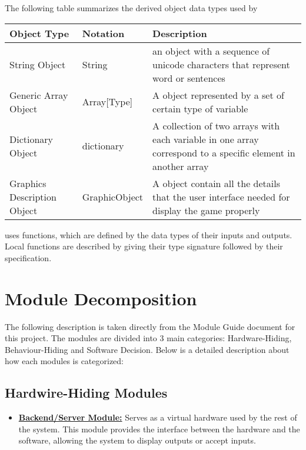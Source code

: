 \documentclass[12pt, titlepage]{article}
\begin{document}
The following table summarizes the derived object data types used by 

\begin{center}
\renewcommand{\arraystretch}{1.2}
\noindent 
\begin{tabular}{l l p{7.5cm}} 
\toprule 
\textbf{Object Type} & \textbf{Notation} & \textbf{Description}\\ 
\midrule
String Object & String & an object with a sequence of unicode characters that represent word or sentences\\
Generic Array Object & Array[Type] & A object represented by a set of certain type of variable \\
Dictionary Object & dictionary & A collection of two arrays with each variable in one array correspond to a specific element in another array\\
Graphics Description Object & GraphicObject & A object contain all the details that the user interface needed for display the game properly\\
\bottomrule
\end{tabular} 
\end{center}



\noindent
{} uses functions, which
are defined by the data types of their inputs and outputs. Local functions are
described by giving their type signature followed by their specification.

\section{Module Decomposition}

The following description is taken directly from the Module Guide document for this project. The modules are divided into 3 main categories: Hardware-Hiding, Behaviour-Hiding and Software Decision. Below is a detailed description about how each modules is categorized:

\subsection{Hardwire-Hiding Modules}

\begin{itemize}
\item \hyperref[BSM]{\textbf{Backend/Server Module:}} Serves as a virtual hardware used by the rest of the system. This module provides the interface between the hardware and the software, allowing the system to display
outputs or accept inputs.
\end{itemize}
\end{document}
